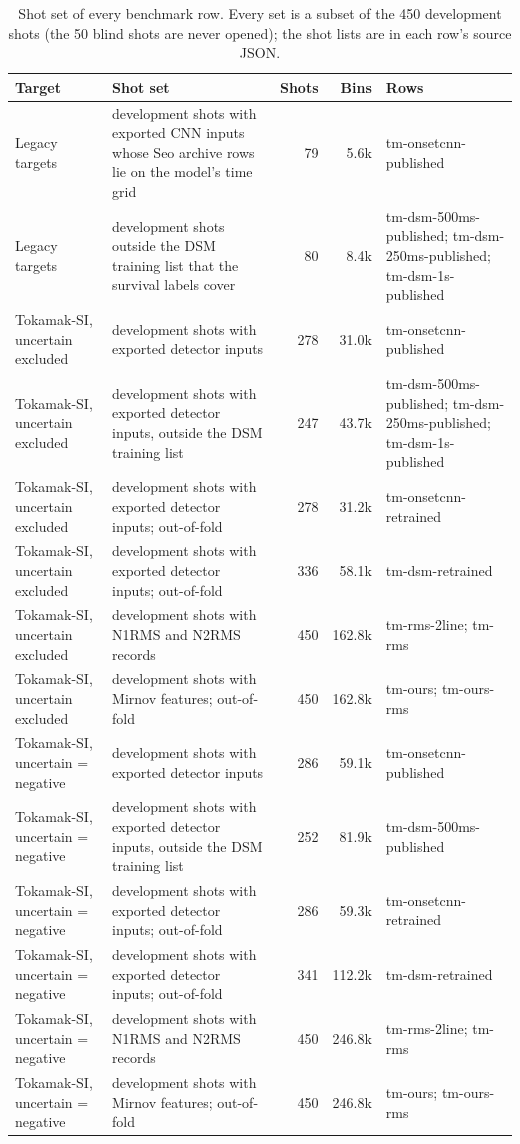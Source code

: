 \begin{table}[t]
\centering
\scriptsize
\setlength{\tabcolsep}{3pt}
\begin{tabular}{>{\raggedright\arraybackslash}p{1.2in}>{\raggedright\arraybackslash}p{2.0in}rr>{\raggedright\arraybackslash}p{1.7in}}
\toprule
Target & Shot set & Shots & Bins & Rows \\
\midrule
Legacy targets & development shots with exported CNN inputs whose Seo archive rows lie on the model's time grid & 79 & 5.6k & tm-onsetcnn-published \\
Legacy targets & development shots outside the DSM training list that the survival labels cover & 80 & 8.4k & tm-dsm-500ms-published; tm-dsm-250ms-published; tm-dsm-1s-published \\
Tokamak-SI, uncertain excluded & development shots with exported detector inputs & 278 & 31.0k & tm-onsetcnn-published \\
Tokamak-SI, uncertain excluded & development shots with exported detector inputs, outside the DSM training list & 247 & 43.7k & tm-dsm-500ms-published; tm-dsm-250ms-published; tm-dsm-1s-published \\
Tokamak-SI, uncertain excluded & development shots with exported detector inputs; out-of-fold & 278 & 31.2k & tm-onsetcnn-retrained \\
Tokamak-SI, uncertain excluded & development shots with exported detector inputs; out-of-fold & 336 & 58.1k & tm-dsm-retrained \\
Tokamak-SI, uncertain excluded & development shots with N1RMS and N2RMS records & 450 & 162.8k & tm-rms-2line; tm-rms \\
Tokamak-SI, uncertain excluded & development shots with Mirnov features; out-of-fold & 450 & 162.8k & tm-ours; tm-ours-rms \\
Tokamak-SI, uncertain = negative & development shots with exported detector inputs & 286 & 59.1k & tm-onsetcnn-published \\
Tokamak-SI, uncertain = negative & development shots with exported detector inputs, outside the DSM training list & 252 & 81.9k & tm-dsm-500ms-published \\
Tokamak-SI, uncertain = negative & development shots with exported detector inputs; out-of-fold & 286 & 59.3k & tm-onsetcnn-retrained \\
Tokamak-SI, uncertain = negative & development shots with exported detector inputs; out-of-fold & 341 & 112.2k & tm-dsm-retrained \\
Tokamak-SI, uncertain = negative & development shots with N1RMS and N2RMS records & 450 & 246.8k & tm-rms-2line; tm-rms \\
Tokamak-SI, uncertain = negative & development shots with Mirnov features; out-of-fold & 450 & 246.8k & tm-ours; tm-ours-rms \\
\bottomrule
\end{tabular}
\caption{Shot set of every benchmark row. Every set is a subset of the 450 development shots (the 50 blind shots are never opened); the shot lists are in each row's source JSON.}
\label{tab:tm-shot-sets}
\end{table}
